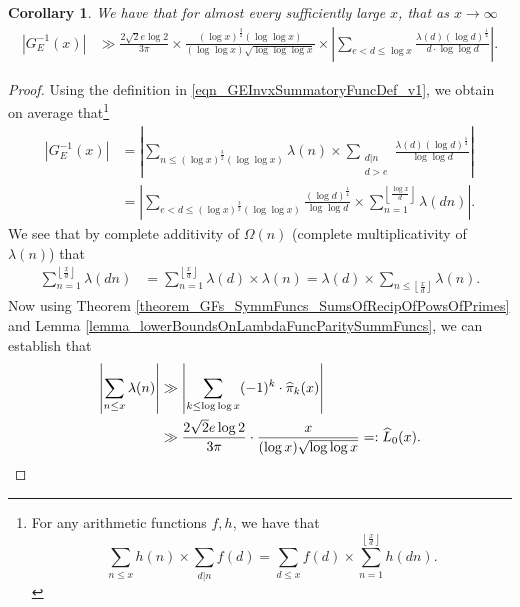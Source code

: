 \documentclass[11pt,reqno,a4letter]{article}
\numberwithin{figure}{section}
\numberwithin{table}{section}
\newcommand{\cf}{\textit{cf.\ }}
\newcommand{\Floor}[2]{\ensuremath{\left\lfloor \frac{#1}{#2} \right\rfloor}}
\theoremstyle{plain}
\newtheorem{cor}[theorem]{Corollary}
\numberwithin{theorem}{section}
\theoremstyle{definition}
\newcommand{\NBRef}[1]{}
\newcommand{\SuccSim}[0]{\overset{_{\scriptsize{\blacktriangle}}}{\succsim}}
\renewcommand{\SuccSim}[0]{\ensuremath{\gg}}
\begin{document}
\begin{cor} 
\label{cor_ASemiForm_ForGInvx_v1} 
We have that for almost every sufficiently large $x$, that as $x \rightarrow \infty$ 
\begin{align*} 
\left\lvert G_E^{-1}(x) \right\rvert & \SuccSim 
     \frac{2\sqrt{2} e \log 2}{3\pi} \times 
     \frac{(\log x)^{\frac{3}{2}} (\log\log x)}{(\log\log x) \sqrt{\log\log\log x}} \times 
     \left\lvert \sum_{e < d \leq \log x} 
     \frac{\lambda(d) (\log d)^{\frac{1}{4}}}{d \cdot \log\log d} 
     \right\rvert. 
\end{align*} 
\end{cor} 
\NBRef{A10-2020.04-26} 
\begin{proof} 
Using the definition in \eqref{eqn_GEInvxSummatoryFuncDef_v1}, we obtain on average that\footnote{ 
     For any arithmetic functions $f,h$, we have that \cite[\cf \S 3.10; \S 3.12]{APOSTOLANUMT} 
     \[
     \sum_{n \leq x} h(n) \times \sum_{d|n} f(d) = \sum_{d \leq x} f(d) \times \sum_{n=1}^{\Floor{x}{d}} h(dn). 
     \] 
}
\begin{align*} 
\left\lvert G_E^{-1}(x) \right\rvert & = 
     \left\lvert \sum_{n \leq (\log x)^{\frac{3}{2}} (\log\log x)} \lambda(n) \times 
     \sum_{\substack{d|n \\ d > e}} \frac{\lambda(d) (\log d)^{\frac{1}{4}}}{\log\log d} \right\rvert \\ 
     & = \left\lvert \sum_{e < d \leq (\log x)^{\frac{3}{2}} (\log\log x)} 
     \frac{(\log d)^{\frac{1}{4}}}{\log\log d} \times 
     \sum_{n=1}^{\Floor{\log x}{d}} \lambda(dn) \right\rvert. 
\end{align*} 
We see that by complete additivity of $\Omega(n)$ 
(complete multiplicativity of $\lambda(n)$) that 
\begin{align*} 
\sum_{n=1}^{\Floor{x}{d}} \lambda(dn) & = \sum_{n=1}^{\Floor{x}{d}} \lambda(d) \times \lambda(n) 
     = \lambda(d) \times \sum_{n \leq \Floor{x}{d}} \lambda(n). 
\end{align*} 
Now using Theorem \ref{theorem_GFs_SymmFuncs_SumsOfRecipOfPowsOfPrimes} and 
Lemma \ref{lemma_lowerBoundsOnLambdaFuncParitySummFuncs}, 
we can establish that 
\begin{align} 
\label{eqn_proof_tag_GEInvxLowerBound_v1} 
\left\lvert \sum_{n \leq x} \lambda(n) \right\rvert & \gg 
     \left\lvert \sum_{k \leq \log\log x} (-1)^k \cdot \widehat{\pi}_k(x) \right\rvert \\ 
\notag 
     & \gg \frac{2\sqrt{2} e \log 2}{3\pi} \cdot 
     \frac{x}{(\log x) \sqrt{\log\log x}} 
     =: \widehat{L}_0(x). 

\end{align}
\end{proof}
\end{document}

